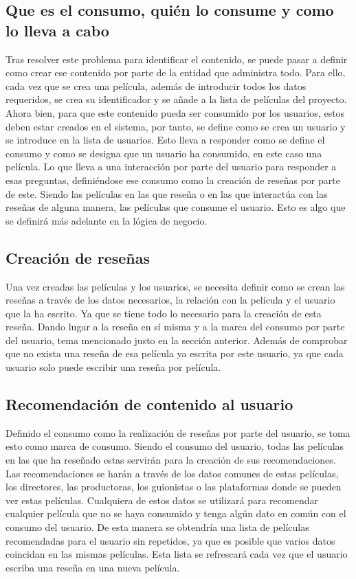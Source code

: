 \subsection{Que es el consumo, quién lo consume y como lo lleva a cabo}

Tras resolver este problema para identificar el contenido, se puede pasar a definir como crear ese 
contenido por parte de la entidad que administra todo. Para ello, cada vez que se crea una película, 
además de introducir todos los datos requeridos, se crea su identificador y se añade a la lista de 
películas del proyecto. Ahora bien, para que este contenido pueda ser consumido por los usuarios, estos
deben estar creados en el sistema, por tanto, se define como se crea un usuario y se introduce 
en la lista de usuarios. Esto lleva a responder como se define el consumo y como se designa que un 
usuario ha consumido, en este caso una película. Lo que lleva a una interacción por parte del 
usuario para responder a esas preguntas, definiéndose ese consumo como la creación de reseñas por parte de este.
Siendo las películas en las que reseña o en las que interactúa con las reseñas de alguna manera, las películas que 
consume el usuario. Esto es algo que se definirá más adelante en la lógica de negocio. 

\subsection{Creación de reseñas}

Una vez creadas las películas y los usuarios, se necesita definir como se crean las reseñas a través de 
los datos necesarios, la relación con la película y el usuario que la ha escrito. Ya que se tiene todo 
lo necesario para la creación de esta reseña. Dando lugar a la reseña en sí misma y a la marca del 
consumo por parte del usuario, tema mencionado justo en la sección anterior. Además de comprobar que no 
exista una reseña de esa película ya escrita por este usuario, ya que cada usuario solo puede escribir 
una reseña por película.

\subsection{Recomendación de contenido al usuario}

Definido el consumo como la realización de reseñas por parte del usuario, se toma esto como marca 
de consumo. Siendo el consumo del usuario, todas las películas en las que ha 
reseñado estas servirán para la creación de sus recomendaciones. Las recomendaciones 
se harán a través de los datos comunes de estas películas, los directores, las productoras, los guionistas o las 
plataformas donde se pueden ver estas películas. Cualquiera de estos datos se utilizará para recomendar cualquier 
película que no se haya consumido y tenga algún dato en común con el consumo del usuario. De esta manera 
se obtendría una lista de películas recomendadas para el usuario sin repetidos, ya que es posible que varios datos 
coincidan en las mismas películas. Esta lista se refrescará cada vez que el usuario escriba una reseña 
en una nueva película.

